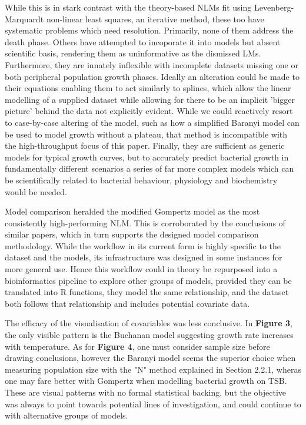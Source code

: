 \documentclass[11pt]{article}
\begin{document}
While this is in stark contrast with the theory-based NLMs fit using Levenberg-Marquardt non-linear least squares, an iterative method, these too have systematic problems which need resolution. Primarily, none of them address the death phase. Others have attempted to incoporate it into models but absent scientific basis, rendering them as uninformative as the dismissed LMs.\parencite{Peleg1997} Furthermore, they are innately inflexible with incomplete datasets missing one or both peripheral population growth phases. Ideally an alteration could be made to their equations enabling them to act similarly to splines, which allow the linear modelling of a supplied dataset while allowing for there to be an implicit 'bigger picture' behind the data not explicitly evident. While we could reactively resort to case-by-case altering of the model, such as how a simplified Baranyi model can be used to model growth without a plateau, that method is incompatible with the high-throughput focus of this paper.\parencite{Baranyi1993} Finally, they are sufficient as generic models for typical growth curves, but to accurately predict bacterial growth in fundamentally different scenarios a series of far more complex models which can be scientifically related to bacterial behaviour, physiology and biochemistry would be needed. 

Model comparison heralded the modified Gompertz model as the most consistently high-performing NLM. This is corroborated by the conclusions of similar papers, which in turn supports the designed model comparison methodology.\parencite{Zwietering1990,Buchanan1997} While the workflow in its current form is highly specific to the dataset and the models, its infrastructure was designed in some instances for more general use. Hence this workflow could in theory be repurposed into a bioinformatics pipeline to explore other groups of models, provided they can be translated into R functions, they model the same relationship, and the dataset both follows that relationship and includes potential covariate data.

The efficacy of the visualisation of covariables was less conclusive. In \textbf{Figure 3}, the only visible pattern is the Buchanan model suggesting growth rate increases with temperature. As for \textbf{Figure 4}, one must consider sample size before drawing conclusions, however the Baranyi model seems the superior choice when measuring population size with the "N" method explained in Section 2.2.1, wheras one may fare better with Gompertz when modelling bacterial growth on TSB. These are visual patterns with no formal statistical backing, but the objective was always to point towards potential lines of investigation, and could continue to with alternative groups of models.
\end{document}
